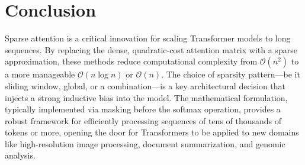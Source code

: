 \documentclass{article}
\begin{document}
\section{Conclusion}

Sparse attention is a critical innovation for scaling Transformer models to long sequences. By replacing the dense, quadratic-cost attention matrix with a sparse approximation, these methods reduce computational complexity from \(\mathcal{O}(n^2)\) to a more manageable \(\mathcal{O}(n \log n)\) or \(\mathcal{O}(n)\). The choice of sparsity pattern—be it sliding window, global, or a combination—is a key architectural decision that injects a strong inductive bias into the model. The mathematical formulation, typically implemented via masking before the softmax operation, provides a robust framework for efficiently processing sequences of tens of thousands of tokens or more, opening the door for Transformers to be applied to new domains like high-resolution image processing, document summarization, and genomic analysis.
\end{document}
